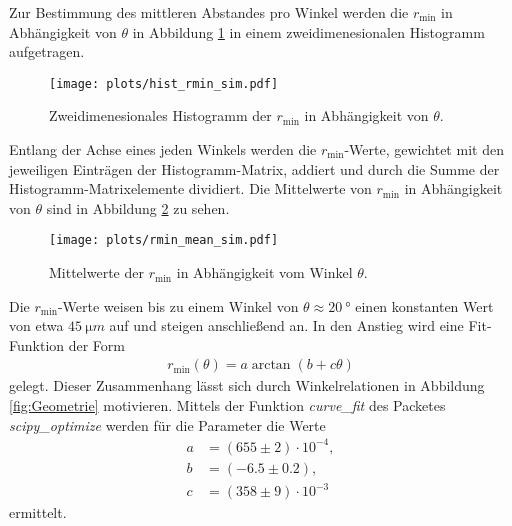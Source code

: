 Zur Bestimmung des mittleren Abstandes pro Winkel werden die $r_{\mathrm{min}}$ in Abhängigkeit von $\theta$ in Abbildung \ref{fig:Hist_rmin_sim} in einem zweidimenesionalen Histogramm aufgetragen.
\begin{figure}
    \centering
    \texttt{[image: plots/hist\_rmin\_sim.pdf]}
    \caption{Zweidimenesionales Histogramm der $r_{\mathrm{min}}$ in Abhängigkeit von $\theta$.}
    \label{fig:Hist_rmin_sim}
\end{figure}
\FloatBarrier
Entlang der Achse eines jeden Winkels werden die $r_{\mathrm{min}}$-Werte, gewichtet mit den jeweiligen Einträgen der Histogramm-Matrix, addiert und durch die Summe der Histogramm-Matrixelemente dividiert. Die Mittelwerte von $r_{\mathrm{min}}$ in Abhängigkeit von $\theta$ sind in Abbildung \ref{fig:rmin_mean_sim} zu sehen.
\begin{figure}
    \centering
    \texttt{[image: plots/rmin\_mean\_sim.pdf]}
    \caption{Mittelwerte der $r_{\mathrm{min}}$ in Abhängigkeit vom Winkel $\theta$. }
    \label{fig:rmin_mean_sim}
\end{figure}
\FloatBarrier
Die $r_{\mathrm{min}}$-Werte weisen bis zu einem Winkel von $\theta \approx \SI{20}{°}$ einen konstanten Wert von etwa $\SI{45}{\micro m}$ auf und steigen anschließend an.
In den Anstieg wird eine Fit-Funktion der Form
\begin{align}
    r_{\mathrm{min}}(\theta) = a \arctan(b + c \theta)
\end{align}
gelegt. Dieser Zusammenhang lässt sich durch Winkelrelationen in Abbildung \ref{fig:Geometrie} motivieren.
Mittels der Funktion \textit{curve\_fit} des Packetes \textit{scipy\_optimize} werden für die Parameter die Werte
\begin{align*}
    a &= (655 \pm 2)\cdot 10^{-4} ,\\
    b &= (-6.5 \pm 0.2),\\
    c &= (358 \pm 9)\cdot 10^{-3}
\end{align*}
ermittelt.

